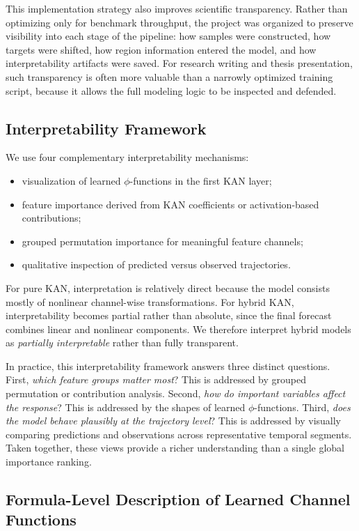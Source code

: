 \documentclass[10pt,conference,onecolumn]{IEEEtran}
\begin{document}
This implementation strategy also improves scientific transparency. Rather than optimizing only for benchmark throughput, the project was organized to preserve visibility into each stage of the pipeline: how samples were constructed, how targets were shifted, how region information entered the model, and how interpretability artifacts were saved. For research writing and thesis presentation, such transparency is often more valuable than a narrowly optimized training script, because it allows the full modeling logic to be inspected and defended.

\subsection{Interpretability Framework}

We use four complementary interpretability mechanisms:
\begin{itemize}
    \item visualization of learned $\phi$-functions in the first KAN layer;
    \item feature importance derived from KAN coefficients or activation-based contributions;
    \item grouped permutation importance for meaningful feature channels;
    \item qualitative inspection of predicted versus observed trajectories.
\end{itemize}

For pure KAN, interpretation is relatively direct because the model consists mostly of nonlinear channel-wise transformations. For hybrid KAN, interpretability becomes partial rather than absolute, since the final forecast combines linear and nonlinear components. We therefore interpret hybrid models as \emph{partially interpretable} rather than fully transparent.

In practice, this interpretability framework answers three distinct questions. First, \emph{which feature groups matter most}? This is addressed by grouped permutation or contribution analysis. Second, \emph{how do important variables affect the response}? This is addressed by the shapes of learned $\phi$-functions. Third, \emph{does the model behave plausibly at the trajectory level}? This is addressed by visually comparing predictions and observations across representative temporal segments. Taken together, these views provide a richer understanding than a single global importance ranking.

\subsection{Formula-Level Description of Learned Channel Functions}
\end{document}
